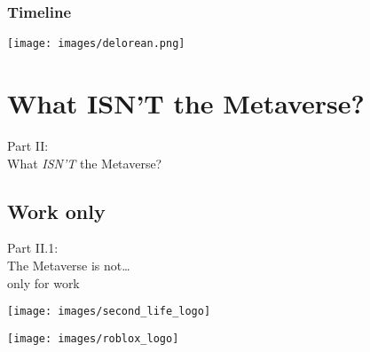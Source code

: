 \documentclass[aspectratio=169,x11names]{beamer}
\begin{document}
\begin{frame}
\frametitle{Timeline}
\vfill\vfill
\begin{center}
\texttt{[image: images/delorean.png]} 
\end{center}
\end{frame}

\section{What ISN'T the Metaverse?}

\begin{frame}
\begin{center}
\Large
Part II:\bigskip\\
\huge
What \emph{ISN'T} the Metaverse?
\end{center}
\end{frame}

\subsection{Work only}

\begin{frame}
\begin{center}
\Large
Part II.1:\bigskip\\
\huge
The Metaverse is not\dots\\ only for work
\end{center}
\end{frame}


\begin{frame}
\begin{minipage}{0.45\textwidth}
\begin{center}
\texttt{[image: images/second\_life\_logo]} 
\end{center}
\end{minipage}%
\begin{minipage}{0.55\textwidth}
\begin{center}
\end{center}
\end{minipage}
\end{frame}

\begin{frame}
\begin{minipage}{0.45\textwidth}
\begin{center}
\texttt{[image: images/roblox\_logo]} 
\end{center}
\end{minipage}%
\begin{minipage}{0.55\textwidth}
\begin{center}
\end{center}
\end{minipage}
\end{frame}
\end{document}
